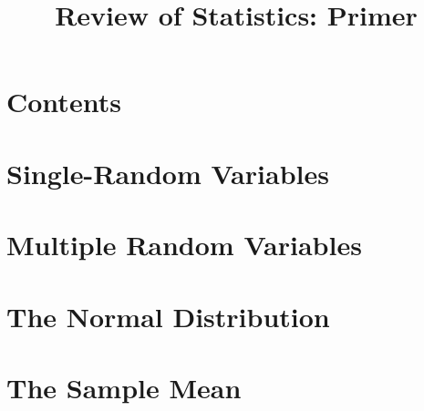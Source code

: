 \title[Statistics]{Review of Statistics: Primer}
\date{}




\section{Contents}

\section{Single-Random Variables}

\section{Multiple Random Variables}

\section{The Normal Distribution}

\section{The Sample Mean}

